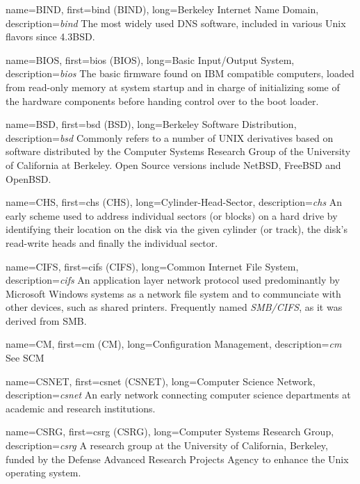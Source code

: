 {
	name={BIND},
	first={\acrlong{bind} (BIND)},
	long={Berkeley Internet Name Domain},
	description={{\em \acrlong{bind}} The most widely used DNS
software, included in various Unix flavors since
4.3BSD.}
}

{
	name={BIOS},
	first={\acrlong{bios} (BIOS)},
	long={Basic Input/Output System},
	description={{\em \acrlong{bios}} The basic firmware found on
IBM compatible computers, loaded from read-only memory at system startup
and in charge of initializing some of the hardware components before
handing control over to the boot loader.}
}

{
	name={BSD},
	first={\acrlong{bsd} (BSD)},
	long={Berkeley Software Distribution},
	description={{\em \acrlong{bsd}} Commonly refers to a number of
UNIX derivatives based on software distributed by the Computer Systems
Research Group of the University of California at Berkeley.  Open Source
versions include NetBSD, FreeBSD and OpenBSD.}
}

{
	name={CHS},
	first={\acrlong{chs} (CHS)},
	long={Cylinder-Head-Sector},
	description={{\em \acrlong{chs}} An early scheme used to address
individual sectors (or blocks) on a hard drive by identifying their
location on the disk via the given cylinder (or track), the disk's
read-write heads and finally the individual sector.}
}

{
	name={CIFS},
	first={\acrlong{cifs} (CIFS)},
	long={Common Internet File System},
	description={{\em \acrlong{cifs}} An application layer network
protocol used predominantly by Microsoft Windows systems as a network file
system and to communciate with other devices, such as shared printers.
Frequently named {\em SMB/CIFS}, as it was derived from SMB.}
}

{
	name={CM},
	first={\acrlong{cm} (CM)},
	long={Configuration Management},
	description={{\em \acrlong{cm}} See SCM}
}

{
	name={CSNET},
	first={\acrlong{csnet} (CSNET)},
	long={Computer Science Network},
	description={{\em \acrlong{csnet}} An early network connecting
computer science departments at academic and research
institutions.}
}

{
	name={CSRG},
	first={\acrlong{csrg} (CSRG)},
	long={Computer Systems Research Group},
	description={{\em \acrlong{csrg}} A research group at the
University of California, Berkeley, funded by the Defense Advanced
Research Projects Agency to enhance the Unix operating
system.}
}

